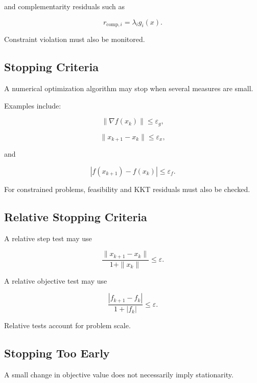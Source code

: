 and complementarity residuals such as

\[
\boxed{
r_{\mathrm{comp},i}
=
\lambda_i g_i(x).
}
\]

Constraint violation must also be monitored.

\subsection{Stopping Criteria}
\label{subsec:optimization-stopping-criteria}

A numerical optimization algorithm may stop when several measures are
small.

Examples include:

\[
\boxed{
\|\nabla f(x_k)\|
\leq
\varepsilon_g,
}
\]

\[
\boxed{
\|x_{k+1}-x_k\|
\leq
\varepsilon_x,
}
\]

and

\[
\boxed{
|f(x_{k+1})-f(x_k)|
\leq
\varepsilon_f.
}
\]

For constrained problems, feasibility and KKT residuals must also be
checked.

\subsection{Relative Stopping Criteria}
\label{subsec:relative-optimization-stopping}

A relative step test may use

\[
\boxed{
\frac{
\|x_{k+1}-x_k\|
}{
1+\|x_k\|
}
\leq
\varepsilon.
}
\]

A relative objective test may use

\[
\boxed{
\frac{
|f_{k+1}-f_k|
}{
1+|f_k|
}
\leq
\varepsilon.
}
\]

Relative tests account for problem scale.

\subsection{Stopping Too Early}
\label{subsec:optimization-stopping-too-early}

A small change in objective value does not necessarily imply stationarity.

